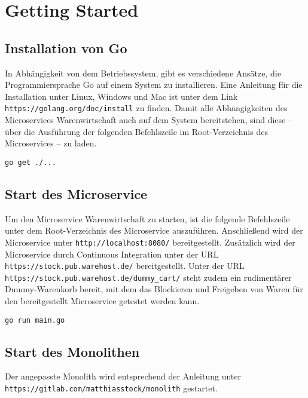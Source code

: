 \section{Getting Started}
\label{sec: Getting Started}

\subsection{Installation von Go}
In Abhängigkeit von dem Betriebssystem, gibt es verschiedene Ansätze, die Programmiersprache Go auf einem System zu installieren. Eine Anleitung für die Installation unter Linux, Windows und Mac ist unter dem Link \texttt{https://golang.org/doc/install} zu finden. Damit alle Abhängigkeiten des Microservices Warenwirtschaft auch auf dem System bereitstehen, sind diese -- über die Ausführung der folgenden Befehlszeile im Root-Verzeichnis des Microservices -- zu laden.
\begin{lstlisting}[caption=Laden der Abhängigkeiten]
go get ./...
\end{lstlisting}

\subsection{Start des Microservice}
Um den Microservice Warenwirtschaft zu starten, ist die folgende Befehlszeile unter dem Root-Verzeichnis des Microservice auszuführen. Anschließend wird der Microservice unter \linebreak \texttt{http://localhost:8080/} bereitgestellt. Zusätzlich wird der Microservice durch Continuous Integration unter der URL \linebreak \texttt{https://stock.pub.warehost.de/} bereitgestellt. Unter der URL
 \texttt{https://stock.pub.\linebreak warehost.de/dummy\_cart/} steht zudem ein rudimentärer Dummy-Warenkorb bereit, mit dem das Blockieren und Freigeben von Waren für den bereitgestellt Microservice getestet werden kann.
\begin{lstlisting}[caption=Start des Go-Microservice]
go run main.go
\end{lstlisting}

\subsection{Start des Monolithen}
Der angepasste Monolith wird entsprechend der Anleitung unter \linebreak \texttt{https://gitlab.com/matthiasstock/monolith} gestartet.
